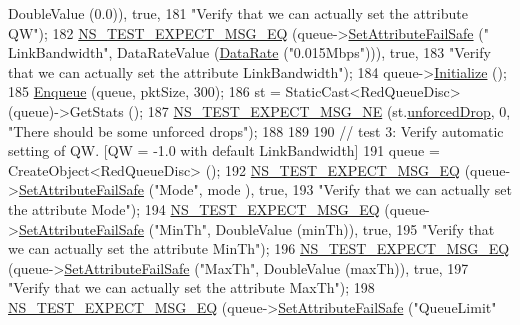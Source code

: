 \begin{DoxyCode}
      DoubleValue (0.0)), \textcolor{keyword}{true},
181                          \textcolor{stringliteral}{"Verify that we can actually set the attribute QW"});
182   \hyperlink{group__testing_ga7304ba46a28d8cf08dfdfd6499cf7068}{NS\_TEST\_EXPECT\_MSG\_EQ} (queue->\hyperlink{classns3_1_1ObjectBase_aa7d333004e970f925a4ed5df275541b5}{SetAttributeFailSafe} (\textcolor{stringliteral}{"
      LinkBandwidth"}, DataRateValue (\hyperlink{classns3_1_1DataRate}{DataRate} (\textcolor{stringliteral}{"0.015Mbps"}))), \textcolor{keyword}{true},
183                          \textcolor{stringliteral}{"Verify that we can actually set the attribute LinkBandwidth"});
184   queue->\hyperlink{classns3_1_1Object_af4411cb29971772fcd09203474a95078}{Initialize} ();
185   \hyperlink{classAredQueueDiscTestCase_a5528c44233e1056913e76d5be988f049}{Enqueue} (queue, pktSize, 300);
186   st = StaticCast<RedQueueDisc> (queue)->GetStats ();
187   \hyperlink{group__testing_ga6d4b162d26b8a930115b97dd5f3d9ed9}{NS\_TEST\_EXPECT\_MSG\_NE} (st.\hyperlink{structns3_1_1RedQueueDisc_1_1Stats_a242027f6eb7d30e2cd636c52080e2c73}{unforcedDrop}, 0, \textcolor{stringliteral}{"There should be some
       unforced drops"});
188 
189 
190   \textcolor{comment}{// test 3: Verify automatic setting of QW. [QW = -1.0 with default LinkBandwidth]}
191   queue = CreateObject<RedQueueDisc> ();
192   \hyperlink{group__testing_ga7304ba46a28d8cf08dfdfd6499cf7068}{NS\_TEST\_EXPECT\_MSG\_EQ} (queue->\hyperlink{classns3_1_1ObjectBase_aa7d333004e970f925a4ed5df275541b5}{SetAttributeFailSafe} (\textcolor{stringliteral}{"Mode"}, mode
      ), \textcolor{keyword}{true},
193                          \textcolor{stringliteral}{"Verify that we can actually set the attribute Mode"});
194   \hyperlink{group__testing_ga7304ba46a28d8cf08dfdfd6499cf7068}{NS\_TEST\_EXPECT\_MSG\_EQ} (queue->\hyperlink{classns3_1_1ObjectBase_aa7d333004e970f925a4ed5df275541b5}{SetAttributeFailSafe} (\textcolor{stringliteral}{"MinTh"}, 
      DoubleValue (minTh)), \textcolor{keyword}{true},
195                          \textcolor{stringliteral}{"Verify that we can actually set the attribute MinTh"});
196   \hyperlink{group__testing_ga7304ba46a28d8cf08dfdfd6499cf7068}{NS\_TEST\_EXPECT\_MSG\_EQ} (queue->\hyperlink{classns3_1_1ObjectBase_aa7d333004e970f925a4ed5df275541b5}{SetAttributeFailSafe} (\textcolor{stringliteral}{"MaxTh"}, 
      DoubleValue (maxTh)), \textcolor{keyword}{true},
197                          \textcolor{stringliteral}{"Verify that we can actually set the attribute MaxTh"});
198   \hyperlink{group__testing_ga7304ba46a28d8cf08dfdfd6499cf7068}{NS\_TEST\_EXPECT\_MSG\_EQ} (queue->\hyperlink{classns3_1_1ObjectBase_aa7d333004e970f925a4ed5df275541b5}{SetAttributeFailSafe} (\textcolor{stringliteral}{"QueueLimit"}

\end{DoxyCode}
